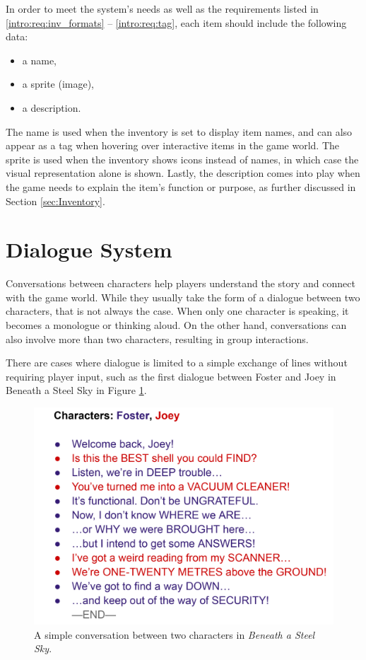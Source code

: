 In order to meet the system's needs as well as the requirements listed in \ref{intro:req:inv_formats} – \ref{intro:req:tag}, each item should include the following data:
\begin{itemize}
\item a name,
\item a sprite (image),
\item a description.
\end{itemize}

The name is used when the inventory is set to display item names, and can also appear as a tag when hovering over interactive items in the game world. The sprite is used when the inventory shows icons instead of names, in which case the visual representation alone is shown. Lastly, the description comes into play when the game needs to explain the item's function or purpose, as further discussed in Section \ref{sec:Inventory}.



\section{Dialogue System}
Conversations between characters help players understand the story and connect with the game world. While they usually take the form of a dialogue between two characters, that is not always the case. When only one character is speaking, it becomes a monologue or thinking aloud. On the other hand, conversations can also involve more than two characters, resulting in group interactions. 

There are cases where dialogue is limited to a simple exchange of lines without requiring player input, such as the first dialogue between Foster and Joey in Beneath a Steel Sky in Figure \ref{fig:DialogueSimple}. 

\begin{figure}[H]
\centering
\includegraphics[width=.6\linewidth]{img/dialogueSimple.png}
\caption{A simple conversation between two characters in \textit{Beneath a Steel Sky}.}
\label{fig:DialogueSimple}
\end{figure}

